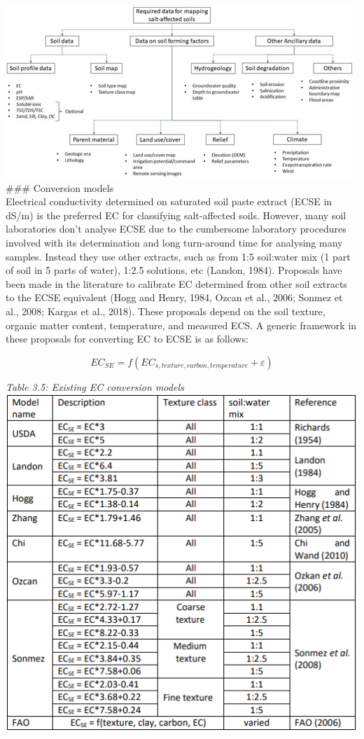 \documentclass[
  10pt,
  b5paper,
]{book}
\begin{document}
\includegraphics{figures/images/Figure3.7.jpg}\\
\#\#\# Conversion models\\
Electrical conductivity determined on saturated soil paste extract (ECSE in dS/m) is the preferred EC for classifying salt-affected soils. However, many soil laboratories don't analyse ECSE due to the cumbersome laboratory procedures involved with its determination and long turn-around time for analysing many samples. Instead they use other extracts, such as from 1:5 soil:water mix (1 part of soil in 5 parts of water), 1:2.5 solutions, etc (Landon, 1984). Proposals have been made in the literature to calibrate EC determined from other soil extracts to the ECSE equivalent (Hogg and Henry, 1984, Ozcan et al., 2006; Sonmez et al., 2008; Kargas et al., 2018). These proposals depend on the soil texture, organic matter content, temperature, and measured ECS. A generic framework in these proposals for converting EC to ECSE is as follows:

\begin{equation}
\tag{3.1}
EC_{SE} = f(EC_{s,texture,carbon,temperature}+ \varepsilon )
\end{equation}

\emph{Table 3.5: Existing EC conversion models}\\
\includegraphics{figures/tables/Table_3.5.PNG}
\end{document}
